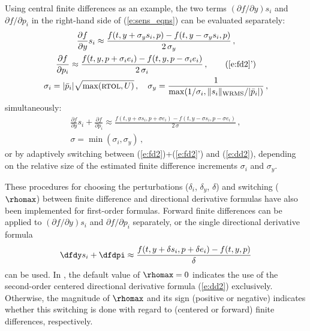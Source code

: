 Using central finite differences as an example, the two terms 
$({\partial f}/{\partial y}) s_i$ 
and ${\partial f}/{\partial p_i}$ in the right-hand side of (\ref{e:sens_eqns}) 
can be evaluated separately:
\begin{gather}
  \frac{\partial f}{\partial y} s_i \approx \frac{f(t, y+\sigma_y s_i, p)-
    f(t, y-\sigma_y s_i, p)}{2\,\sigma_y} \, , \label{e:fd2} \\
  \frac{\partial f}{\partial p_i} \approx \frac{f(t,y,p + \sigma_i e_i)-
    f(t,y,p - \sigma_i e_i)}{2\,\sigma_i} \, , \tag{\ref{e:fd2}'} \\
  \sigma_i = |{\bar p}_i| \sqrt{\max( \mbox{\sc rtol} , U)} \, , \quad
  \sigma_y = \frac{1}{\max(1/\sigma_i, \|s_i\|_{\mbox{\scriptsize WRMS}}/|{\bar p}_i|)} \, , \nonumber
\end{gather}
simultaneously:
\begin{gather}
  \frac{\partial f}{\partial y} s_i + \frac{\partial f}{\partial p_i} \approx
  \frac{f(t, y+\sigma s_i, p + \sigma e_i) -
    f(t, y-\sigma s_i, p - \sigma e_i)}{2\,\sigma} \, , \label{e:dd2} \\
  \sigma = \min(\sigma_i, \sigma_y) \, , \nonumber
\end{gather}
or by adaptively switching between (\ref{e:fd2})+(\ref{e:fd2}') and (\ref{e:dd2}), 
depending on the relative size of the estimated finite difference 
increments $\sigma_i$ and $\sigma_y$.

These procedures for choosing the perturbations ($\delta_i$,
$\delta_y$, $\delta$) and switching ($\rhomax$) between
finite difference and directional derivative formulas have also been implemented 
for first-order formulas.
Forward finite differences can be applied to $({\partial f}/{\partial y}) s_i$ and
${\partial f}/{\partial p_i}$ separately, or the single directional derivative formula
\begin{equation*}
\dfdy s_i + \dfdpi \approx
\frac{f(t, y+\delta s_i, p + \delta e_i) - f(t, y, p)}{\delta}
\end{equation*}
can be used.
In {\cvodes}, the default value of $\rhomax=0$ indicates the use of
the second-order centered directional derivative formula (\ref{e:dd2}) exclusively.
Otherwise, the magnitude of $\rhomax$ and its sign (positive or
negative) indicates whether this switching is done with regard to
(centered or forward) finite differences, respectively.



